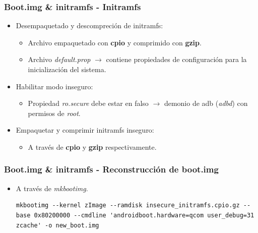 \begin{frame}[fragile]
  \frametitle{Boot.img \& initramfs - Initramfs}
  \begin{itemize}
      \item Desempaquetado y descompreción de initramfs:
      \begin{itemize}
	  \item Archivo empaquetado con \textbf{cpio} y comprimido con \textbf{gzip}.
	  
	  \item Archivo \textit{default.prop} $\rightarrow$ contiene propiedades de configuración para la inicialización del sistema.
      \end{itemize}

      \item Habilitar modo inseguro:
      \begin{itemize}
	  \item Propiedad \textit{ro.secure} debe estar en falso $\rightarrow$ demonio de adb (\textit{adbd}) con permisos de \textit{root}.
      \end{itemize}
      
      \item Empaquetar y comprimir initramfs inseguro:
      \begin{itemize}
	  \item A través de \textbf{cpio} y \textbf{gzip} respectivamente.
      \end{itemize}
  \end{itemize}
\end{frame}

\begin{frame}[fragile]
  \frametitle{Boot.img \& initramfs - Reconstrucción de boot.img}
  \begin{itemize}
      \item A través de \textit{mkbootimg}.
      
      \begin{lstlisting}
mkbootimg --kernel zImage --ramdisk insecure_initramfs.cpio.gz --base 0x80200000 --cmdline 'androidboot.hardware=qcom user_debug=31 zcache' -o new_boot.img
      \end{lstlisting}
  \end{itemize}
\end{frame}

